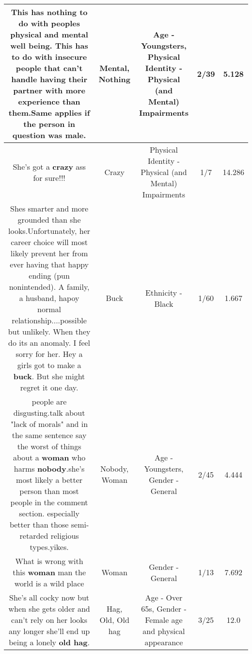 \documentclass[11pt]{article}
\newlength\mylength
\begin{document}
\begin{center}
\begin{longtable}{|C{.65\mylength}|C{.30\mylength}|C{.12\mylength}|C{.12\mylength}|C{.12\mylength}|}
  \small This has \textbf{nothing} to do with peoples physical and \textbf{mental} well being. This has to do with insecure people that can't handle having their partner with more experience than them.Same applies if the person in question was male.\normalsize   & Mental, Nothing & Age - Youngsters, Physical Identity - Physical (and Mental) Impairments & 2/39 & 5.128 \\  \hline
  \small She's got a \textbf{crazy} ass for sure!!!\normalsize   & Crazy & Physical Identity - Physical (and Mental) Impairments & 1/7 & 14.286 \\  \hline
  \small Shes smarter and more grounded than she looks.Unfortunately, her career choice will most likely prevent her from ever having that happy ending (pun nonintended). A family, a husband, hapoy normal relationship....possible but unlikely. When they do its an anomaly. I feel sorry for her. Hey a girls got to make a \textbf{buck}. But she might regret it one day.\normalsize   & Buck & Ethnicity - Black & 1/60 & 1.667 \\  \hline
  \small people are disgusting.talk about "lack of morals" and in the same sentence say the worst of things about a \textbf{woman} who harms \textbf{nobody}.she's most likely a better person than most people in the comment section. especially better than those semi-retarded religious types.yikes.\normalsize   & Nobody, Woman & Age - Youngsters, Gender - General & 2/45 & 4.444 \\  \hline
  \small What is wrong with this \textbf{woman} man the world is a wild place\normalsize   & Woman & Gender - General & 1/13 & 7.692 \\  \hline
  \small She's all cocky now but when she gets older and can't rely on her looks any longer she'll end up being a lonely \textbf{o\textbf{ld} h\textbf{ag}}.\normalsize   & Hag, Old, Old hag & Age - Over 65s, Gender - Female age and physical appearance & 3/25 & 12.0 \\  \hline

\end{longtable}
\end{center}
\end{document}
